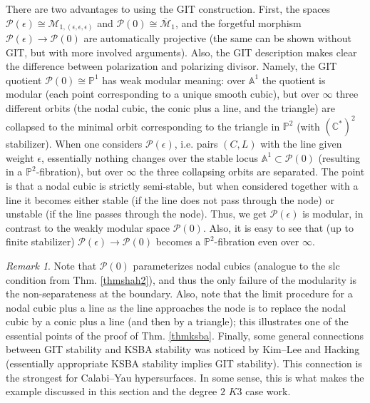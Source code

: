\documentclass{amsart}
\numberwithin{equation}{section}
\theoremstyle{plain}
\theoremstyle{remark}
\newtheorem{remark}[equation]{Remark}
\theoremstyle{definition}
\newcommand{\bP}{\mathbb{P}}
\newcommand{\bA}{\mathbb{A}}
\newcommand{\bC}{\mathbb{C}}
\newcommand{\calM}{\mathcal{M}}
\newcommand{\calP}{\mathcal{P}}
\begin{document}
There are two advantages to using the GIT construction. First, the spaces $\calP(\epsilon)\cong \calM_{1,(\epsilon,\epsilon,\epsilon)}$  and $\calP(0)\cong \overline{\calM}_1$, and the forgetful morphism $\calP(\epsilon)\to \calP(0)$ are automatically projective  (the same can be shown without GIT, but with more involved arguments). Also, the GIT description makes clear the difference between polarization and polarizing divisor. Namely,  the GIT quotient $\calP(0)\cong \bP^1$ has weak modular meaning: over $\bA^1$ the quotient is modular (each point corresponding to a unique smooth cubic), but over $\infty$ three different orbits (the nodal cubic, the conic plus a line, and the triangle) are collapsed to the minimal orbit corresponding to   the triangle in $\bP^2$ (with $(\bC^*)^2$ stabilizer). When one considers $\calP(\epsilon)$, i.e. pairs $(C,L)$ with the line given weight $\epsilon$, essentially nothing changes over the stable locus $\bA^1\subset \calP(0)$ (resulting in a $\bP^2$-fibration), but over $\infty$ the three collapsing orbits are separated. 
The point is that a nodal cubic is strictly semi-stable, but when considered together with a line it becomes either stable (if the line does not pass through the node) or unstable (if the line passes through the node). Thus, we get $\calP(\epsilon)$ is modular, in contrast to the weakly modular space $\calP(0)$. Also, it is easy to see that (up to finite stabilizer) $\calP(\epsilon)\to \calP(0)$ becomes a $\bP^2$-fibration even over $\infty$. 

\begin{remark}
Note that $\calP(0)$ parameterizes nodal cubics (analogue to the slc condition from Thm. \ref{thmshah2}), and thus the only failure of the modularity is the non-separateness at the boundary. Also, note that the limit procedure for a nodal cubic plus a line as the line approaches the node is to replace the nodal cubic by a conic plus a line (and then by a triangle); this illustrates one of the essential points of the proof of Thm. \ref{thmksba}. Finally, some general connections between GIT stability and KSBA stability was noticed by Kim--Lee \cite{kimlee} and Hacking \cite[\S10]{hacking} (essentially appropriate KSBA stability implies GIT stability). This connection is the strongest for Calabi--Yau hypersurfaces. In some sense, this is what  makes the example discussed in this section and the degree $2$ $K3$ case work.
\end{remark}

\end{document}
